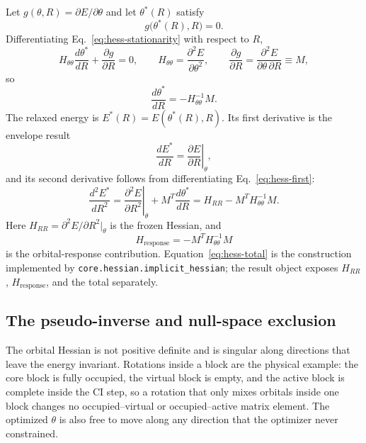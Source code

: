 Let $g(\theta,R)=\partial E/\partial\theta$ and let
$\theta^{*}(R)$ satisfy
\begin{equation}
  g\bigl(\theta^{*}(R),R\bigr)=0.
  \label{eq:hess-stationarity}
\end{equation}
Differentiating Eq.~\eqref{eq:hess-stationarity} with respect to $R$,
\begin{equation}
  H_{\theta\theta}\frac{d\theta^{*}}{dR}
  + \frac{\partial g}{\partial R}=0,
  \qquad
  H_{\theta\theta}
  = \frac{\partial^{2}E}{\partial\theta^{2}},
  \qquad
  \frac{\partial g}{\partial R}
  = \frac{\partial^{2}E}{\partial\theta\,\partial R}
  \equiv M,
  \label{eq:hess-implicit}
\end{equation}
so
\begin{equation}
  \frac{d\theta^{*}}{dR} = -H_{\theta\theta}^{-1}M.
  \label{eq:hess-dtheta}
\end{equation}
The relaxed energy is $E^{*}(R)=E(\theta^{*}(R),R)$.  Its first
derivative is the envelope result
\begin{equation}
  \frac{dE^{*}}{dR}
  = \left.\frac{\partial E}{\partial R}\right|_{\theta},
  \label{eq:hess-first}
\end{equation}
and its second derivative follows from differentiating
Eq.~\eqref{eq:hess-first}:
\begin{equation}
  \frac{d^{2}E^{*}}{dR^{2}}
  = \left.\frac{\partial^{2}E}{\partial R^{2}}\right|_{\theta}
  + M^{T}\frac{d\theta^{*}}{dR}
  = H_{RR} - M^{T}H_{\theta\theta}^{-1}M.
  \label{eq:hess-total}
\end{equation}
Here $H_{RR}=\partial^{2}E/\partial R^{2}|_{\theta}$ is the frozen
Hessian, and
\begin{equation}
  H_{\mathrm{response}} = -M^{T}H_{\theta\theta}^{-1}M
  \label{eq:hess-response}
\end{equation}
is the orbital-response contribution.  Equation~\eqref{eq:hess-total}
is the construction implemented by
\texttt{core.hessian.implicit\_hessian}; the result object exposes
$H_{RR}$, $H_{\mathrm{response}}$, and the total separately.

\subsection{The pseudo-inverse and null-space exclusion}

The orbital Hessian is not positive definite and is singular along
directions that leave the energy invariant.  Rotations inside a block
are the physical example: the core block is fully occupied, the virtual
block is empty, and the active block is complete inside the CI step, so
a rotation that only mixes orbitals inside one block changes no
occupied--virtual or occupied--active matrix element.  The optimized
$\theta$ is also free to move along any direction that the optimizer
never constrained.

